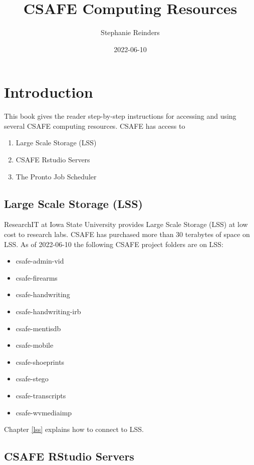 \documentclass[
]{book}
\title{CSAFE Computing Resources}
\author{Stephanie Reinders}
\date{2022-06-10}
\providecommand{\tightlist}{%
  \setlength{\itemsep}{0pt}\setlength{\parskip}{0pt}}
\begin{document}
\maketitle

{
\setcounter{tocdepth}{1}
\tableofcontents
}
\hypertarget{introduction}{%
\chapter{Introduction}\label{introduction}}

This book gives the reader step-by-step instructions for accessing and using several CSAFE computing resources. CSAFE has access to

\begin{enumerate}
\def\labelenumi{\arabic{enumi}.}
\tightlist
\item
  Large Scale Storage (LSS)
\item
  CSAFE Rstudio Servers
\item
  The Pronto Job Scheduler
\end{enumerate}

\hypertarget{large-scale-storage-lss}{%
\section{Large Scale Storage (LSS)}\label{large-scale-storage-lss}}

ResearchIT at Iowa State University provides Large Scale Storage (LSS) at low cost to research labs. CSAFE has purchased more than 30 terabytes of space on LSS. As of 2022-06-10 the following CSAFE project folders are on LSS:

\begin{itemize}
\tightlist
\item
  csafe-admin-vid
\item
  csafe-firearms
\item
  csafe-handwriting
\item
  csafe-handwriting-irb
\item
  csafe-mentisdb
\item
  csafe-mobile
\item
  csafe-shoeprints
\item
  csafe-stego
\item
  csafe-transcripts
\item
  csafe-wvmediaimp
\end{itemize}

Chapter \ref{lss} explains how to connect to LSS.

\hypertarget{csafe-rstudio-servers}{%
\section{CSAFE RStudio Servers}\label{csafe-rstudio-servers}}
\end{document}
